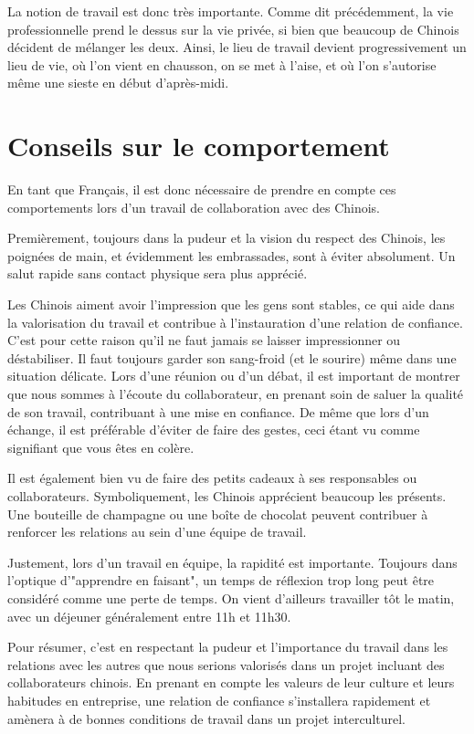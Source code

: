 \documentclass{article}
\begin{document}
La notion de travail est donc très importante. Comme dit précédemment, la vie professionnelle prend le dessus sur la vie privée, si bien que beaucoup de Chinois décident de mélanger les deux. Ainsi, le lieu de travail devient progressivement un lieu de vie, où l'on vient en chausson, on se met à l'aise, et où l'on s'autorise même une sieste en début d'après-midi. \\


\section{Conseils sur le comportement}
En tant que Français, il est donc nécessaire de prendre en compte ces comportements lors d'un travail de collaboration avec des Chinois.

Premièrement, toujours dans la pudeur et la vision du respect des Chinois, les poignées de main, et évidemment les embrassades, sont à éviter absolument. Un salut rapide sans contact physique sera plus apprécié.

Les Chinois aiment avoir l'impression que les gens sont stables, ce qui aide dans la valorisation du travail et contribue à l'instauration d'une relation de confiance. C'est pour cette raison qu'il ne faut jamais se laisser impressionner ou déstabiliser. Il faut toujours garder son sang-froid (et le sourire) même dans une situation délicate. Lors d'une réunion ou d'un débat, il est important de montrer que nous sommes à l'écoute du collaborateur, en prenant soin de saluer la qualité de son travail, contribuant à une mise en confiance. De même que lors d'un échange, il est préférable d'éviter de faire des gestes, ceci étant vu comme signifiant que vous êtes en colère.

Il est également bien vu de faire des petits cadeaux à ses responsables ou collaborateurs. Symboliquement, les Chinois apprécient beaucoup les présents. Une bouteille de champagne ou une boîte de chocolat peuvent contribuer à renforcer les relations au sein d'une équipe de travail.

Justement, lors d'un travail en équipe, la rapidité est importante. Toujours dans l'optique d'"apprendre en faisant", un temps de réflexion trop long peut être considéré comme une perte de temps. On vient d'ailleurs travailler tôt le matin, avec un déjeuner généralement entre 11h et 11h30.\newpage

Pour résumer, c'est en respectant la pudeur et l'importance du travail dans les relations avec les autres que nous serions valorisés dans un projet incluant des collaborateurs chinois. En prenant en compte les valeurs de leur culture et leurs habitudes en entreprise, une relation de confiance s'installera rapidement et amènera à de bonnes conditions de travail dans un projet interculturel. \\
\end{document}
